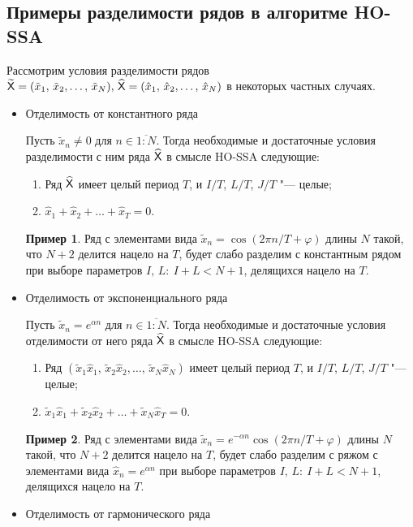 \documentclass[specialist,
    substylefile=spbu.rtx,
    subf,href,colorlinks=true, 12pt]{disser}
\theoremstyle{plain}
\theoremstyle{definition}
\newtheorem{example}{Пример}[section]
\theoremstyle{remark}
\begin{document}
    \subsection{Примеры разделимости рядов в алгоритме HO-SSA}\label{subsec:separation-example}
    Рассмотрим условия разделимости рядов $\widetilde{\mathsf{X}}=(\tilde{x}_{1},\, \tilde{x}_{2},\ldots,\, \tilde{x}_{N}),\, \widehat{\mathsf{X}}=
    (\hat{x}_{1},\, \hat{x}_{2},\ldots,\, \hat{x}_{N})$ в некоторых частных случаях.
    \begin{itemize}
        \item Отделимость от константного ряда

        Пусть $\tilde{x}_n\ne 0$ для $n\in\overline{1:N}$.
        Тогда необходимые и достаточные условия разделимости с ним ряда $\widehat{\mathsf{X}}$ в смысле HO-SSA следующие:
        \begin{enumerate}
            \item Ряд $\widehat{\mathsf{X}}$ имеет целый период $T$, и $I/T$, $L/T$, $J/T$ "--- целые;
            \item $\hat{x}_{1}+\hat{x}_2+\ldots+\hat{x}_T=0$.
        \end{enumerate}
        \begin{example}
            Ряд с элементами вида $\tilde{x}_n=\cos(2\pi n / T + \varphi)$ длины $N$ такой, что $N+2$ делится нацело на
            $T$, будет слабо разделим с константным рядом при выборе параметров $I,\, L:\: I+L< N+1$,
            делящихся нацело на $T$.
        \end{example}
        \item Отделимость от экспоненциального ряда

        Пусть $\tilde{x}_n=e^{\alpha n}$ для $n\in\overline{1:N}$.
        Тогда необходимые и достаточные условия отделимости от него ряда $\widehat{\mathsf{X}}$ в смысле HO-SSA следующие:
        \begin{enumerate}
            \item Ряд $(\tilde{x}_{1}\hat{x}_{1},\, \tilde{x}_{2}\hat{x}_{2},\ldots,\, \tilde{x}_{N}\hat{x}_{N})$
            имеет целый период $T$, и $I/T$, $L/T$, $J/T$ "--- целые;
            \item $\tilde{x}_{1}\hat{x}_{1}+\tilde{x}_{2}\hat{x}_2+\ldots+\tilde{x}_{N}\hat{x}_T=0$.
        \end{enumerate}
        \begin{example}
            Ряд с элементами вида $\tilde{x}_n=e^{-\alpha n}\cos(2\pi n / T + \varphi)$ длины $N$ такой, что $N+2$ делится нацело на
            $T$, будет слабо разделим с ряжом с элементами вида $\hat{x}_n=e^{\alpha n}$ при выборе параметров $I,\, L:\: I+L< N+1$, делящихся нацело на $T$.
        \end{example}
        \item Отделимость от гармонического ряда


\end{itemize}
\end{document}
